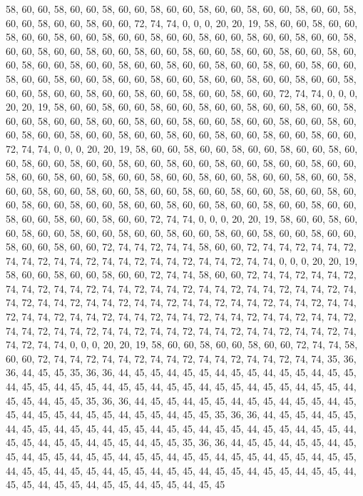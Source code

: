 58, 60, 60, 58, 60, 60, 58, 60, 60, 58, 60, 60, 58, 60, 60, 58, 60, 60, 58, 60, 60, 58, 60, 60, 58, 60, 60, 58, 60, 60, 72, 74, 74, 0, 0, 0, 20, 20, 19, 58, 60, 60, 58, 60, 60, 58, 60, 60, 58, 60, 60, 58, 60, 60, 58, 60, 60, 58, 60, 60, 58, 60, 60, 58,
60, 60, 58, 60, 60, 58, 60, 60, 58, 60, 60, 58, 60, 60, 58, 60, 60, 58, 60, 60, 58, 60, 60, 58, 60, 60, 58, 60, 60, 58, 60, 60, 58, 60, 60, 58, 60, 60, 58, 60, 60, 58, 60, 60, 58, 60, 60, 58, 60, 60, 58, 60, 60, 58, 60, 60, 58, 60, 60, 58, 60, 60, 58, 60,
60, 58, 60, 60, 58, 60, 60, 58, 60, 60, 58, 60, 60, 58, 60, 60, 58, 60, 60, 58, 60, 60, 72, 74, 74, 0, 0, 0, 20, 20, 19, 58, 60, 60, 58, 60, 60, 58, 60, 60, 58, 60, 60, 58, 60, 60, 58, 60, 60, 58, 60, 60, 58, 60, 60, 58, 60, 60, 58, 60, 60, 58, 60, 60,
58, 60, 60, 58, 60, 60, 58, 60, 60, 58, 60, 60, 58, 60, 60, 58, 60, 60, 58, 60, 60, 58, 60, 60, 58, 60, 60, 58, 60, 60, 72, 74, 74, 0, 0, 0, 20, 20, 19, 58, 60, 60, 58, 60, 60, 58, 60, 60, 58, 60, 60, 58, 60, 60, 58, 60, 60, 58, 60, 60, 58, 60, 60, 58,
60, 60, 58, 60, 60, 58, 60, 60, 58, 60, 60, 58, 60, 60, 58, 60, 60, 58, 60, 60, 58, 60, 60, 58, 60, 60, 58, 60, 60, 58, 60, 60, 58, 60, 60, 58, 60, 60, 58, 60, 60, 58, 60, 60, 58, 60, 60, 58, 60, 60, 58, 60, 60, 58, 60, 60, 58, 60, 60, 58, 60, 60, 58, 60,
60, 58, 60, 60, 58, 60, 60, 58, 60, 60, 58, 60, 60, 58, 60, 60, 58, 60, 60, 58, 60, 60, 72, 74, 74, 0, 0, 0, 20, 20, 19, 58, 60, 60, 58, 60, 60, 58, 60, 60, 58, 60, 60, 58, 60, 60, 58, 60, 60, 58, 60, 60, 58, 60, 60, 58, 60, 60, 58, 60, 60, 58, 60, 60,
72, 74, 74, 72, 74, 74, 58, 60, 60, 72, 74, 74, 72, 74, 74, 72, 74, 74, 72, 74, 74, 72, 74, 74, 72, 74, 74, 72, 74, 74, 72, 74, 74, 0, 0, 0, 20, 20, 19, 58, 60, 60, 58, 60, 60, 58, 60, 60, 72, 74, 74, 58, 60, 60, 72, 74, 74, 72, 74, 74, 72, 74, 74, 72,
74, 74, 72, 74, 74, 72, 74, 74, 72, 74, 74, 72, 74, 74, 72, 74, 74, 72, 74, 74, 72, 74, 74, 72, 74, 74, 72, 74, 74, 72, 74, 74, 72, 74, 74, 72, 74, 74, 72, 74, 74, 72, 74, 74, 72, 74, 74, 72, 74, 74, 72, 74, 74, 72, 74, 74, 72, 74, 74, 72, 74, 74, 72, 74,
74, 72, 74, 74, 72, 74, 74, 72, 74, 74, 72, 74, 74, 72, 74, 74, 72, 74, 74, 72, 74, 74, 72, 74, 74, 0, 0, 0, 20, 20, 19, 58, 60, 60, 58, 60, 60, 58, 60, 60, 72, 74, 74, 58, 60, 60, 72, 74, 74, 72, 74, 74, 72, 74, 74, 72, 74, 74, 72, 74, 74, 72, 74, 74,
35, 36, 36, 44, 45, 45, 35, 36, 36, 44, 45, 45, 44, 45, 45, 44, 45, 45, 44, 45, 45, 44, 45, 45, 44, 45, 45, 44, 45, 45, 44, 45, 45, 44, 45, 45, 44, 45, 45, 44, 45, 45, 44, 45, 45, 44, 45, 45, 44, 45, 45, 35, 36, 36, 44, 45, 45, 44, 45, 45, 44, 45, 45, 44,
45, 45, 44, 45, 45, 44, 45, 45, 44, 45, 45, 44, 45, 45, 44, 45, 45, 35, 36, 36, 44, 45, 45, 44, 45, 45, 44, 45, 45, 44, 45, 45, 44, 45, 45, 44, 45, 45, 44, 45, 45, 44, 45, 45, 44, 45, 45, 44, 45, 45, 44, 45, 45, 44, 45, 45, 44, 45, 45, 35, 36, 36, 44, 45,
45, 44, 45, 45, 44, 45, 45, 44, 45, 45, 44, 45, 45, 44, 45, 45, 44, 45, 45, 44, 45, 45, 44, 45, 45, 44, 45, 45, 44, 45, 45, 44, 45, 45, 44, 45, 45, 44, 45, 45, 44, 45, 45, 44, 45, 45, 44, 45, 45, 44, 45, 45, 44, 45, 45, 44, 45, 45, 44, 45, 45, 44, 45, 45
